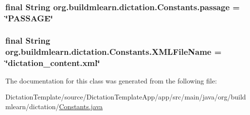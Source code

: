 \subsubsection[{\texorpdfstring{passage}{passage}}]{\setlength{\rightskip}{0pt plus 5cm}final String org.\+buildmlearn.\+dictation.\+Constants.\+passage = \char`\"{}P\+A\+S\+S\+A\+GE\char`\"{}\hspace{0.3cm}{\ttfamily [static]}}\hypertarget{classorg_1_1buildmlearn_1_1dictation_1_1Constants_a80e817295b7afa2e5b5168936e0021b7}{}\label{classorg_1_1buildmlearn_1_1dictation_1_1Constants_a80e817295b7afa2e5b5168936e0021b7}
\subsubsection[{\texorpdfstring{X\+M\+L\+File\+Name}{XMLFileName}}]{\setlength{\rightskip}{0pt plus 5cm}final String org.\+buildmlearn.\+dictation.\+Constants.\+X\+M\+L\+File\+Name = \char`\"{}dictation\+\_\+content.\+xml\char`\"{}\hspace{0.3cm}{\ttfamily [static]}}\hypertarget{classorg_1_1buildmlearn_1_1dictation_1_1Constants_a09a95a6f970bf443c321b3121a4f088e}{}\label{classorg_1_1buildmlearn_1_1dictation_1_1Constants_a09a95a6f970bf443c321b3121a4f088e}


The documentation for this class was generated from the following file\+:\begin{DoxyCompactItemize}
\item 
Dictation\+Template/source/\+Dictation\+Template\+App/app/src/main/java/org/buildmlearn/dictation/\hyperlink{DictationTemplate_2source_2DictationTemplateApp_2app_2src_2main_2java_2org_2buildmlearn_2dictation_2Constants_8java}{Constants.\+java}\end{DoxyCompactItemize}
